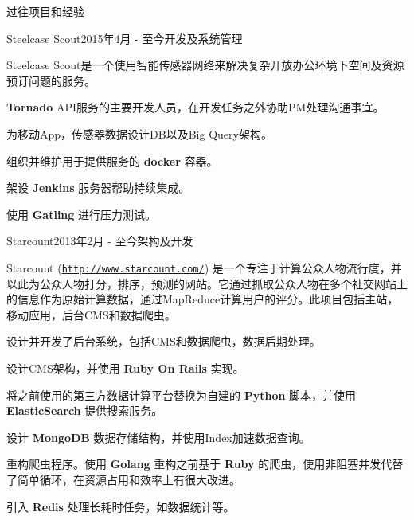 \documentclass{resume} %
\newcommand{\http}{http:/\hspace{-0.3ex}/}
\newcommand{\kaiti}{\CJKfamily{kaiti}}
\begin{document}
\begin{rSection}{\kaiti 过往项目和经验}

\begin{rSubsection}{Steelcase Scout}{2015年4月 - 至今}{开发及系统管理}{}

    Steelcase Scout是一个使用智能传感器网络来解决复杂开放办公环境下空间及资源预订问题的服务。

\begin{rSubsectionList}
\item \textbf{Tornado} API服务的主要开发人员，在开发任务之外协助PM处理沟通事宜。
\item 为移动App，传感器数据设计DB以及Big Query架构。
\item 组织并维护用于提供服务的 \textbf{docker} 容器。
\item 架设 \textbf{Jenkins} 服务器帮助持续集成。
\item 使用 \textbf{Gatling} 进行压力测试。
\end{rSubsectionList}
\end{rSubsection}

\begin{rSubsection}{Starcount}{2013年2月 - 至今}{架构及开发}{}

Starcount (\href{http://www.starcount.com/}{\tt \http{}www.starcount.com/}) 是一个专注于计算公众人物流行度，并以此为公众人物打分，排序，预测的网站。它通过抓取公众人物在多个社交网站上的信息作为原始计算数据，通过MapReduce计算用户的评分。此项目包括主站，移动应用，后台CMS和数据爬虫。

\begin{rSubsectionList}
\item 设计并开发了后台系统，包括CMS和数据爬虫，数据后期处理。
\item 设计CMS架构，并使用 \textbf{Ruby On Rails} 实现。
\item 将之前使用的第三方数据计算平台替换为自建的 \textbf{Python} 脚本，并使用 \textbf{ElasticSearch} 提供搜索服务。
\item 设计 \textbf{MongoDB} 数据存储结构，并使用Index加速数据查询。
\item 重构爬虫程序。使用 \textbf{Golang} 重构之前基于 \textbf{Ruby} 的爬虫，使用非阻塞并发代替了简单循环，在资源占用和效率上有很大改进。
\item 引入 \textbf{Redis} 处理长耗时任务，如数据统计等。
\end{rSubsectionList}
\end{rSubsection}



\end{rSection}
\end{document}
